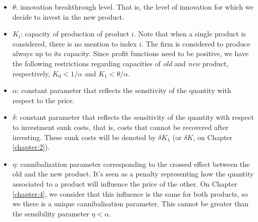 \begin{itemize}
	\item $\theta$: innovation breakthrough level. That is, the level of innovation for which we decide to invest in the new product.
	
	\item $K_i$: capacity of production of product $i$. Note that when a single product is considered, there is no mention to index $i$. The firm is considered to produce always up to its capacity. Since profit functions need to be positive, we have the following restrictions regarding capacities of \textit{old} and \textit{new} product, respectively, $K_0<1/\alpha$ and $K_1<\theta/\alpha$.
	
	\item $\alpha$: constant parameter that reflects the sensitivity of the quantity with respect to the price.
	
	\item $\delta$: constant parameter that reflects the sensitivity of the quantity with respect to investment sunk costs, that is, costs that cannot be recovered after investing. These sunk costs will be denoted by $\delta K_1$ (or $\delta K$, on Chapter \ref{chapter:2}).
	
	\item $\eta$: cannibalization parameter corresponding to the crossed effect between the old and the new product. It's seen as a penalty representing how the quantity associated to a product will influence the price of the other. On Chapter \ref{chapter:4}, we consider that this influence is the same for both products, so we there is a unique cannibalisation parameter. This cannot be greater than the sensibility parameter $\eta <\alpha$.
\end{itemize}